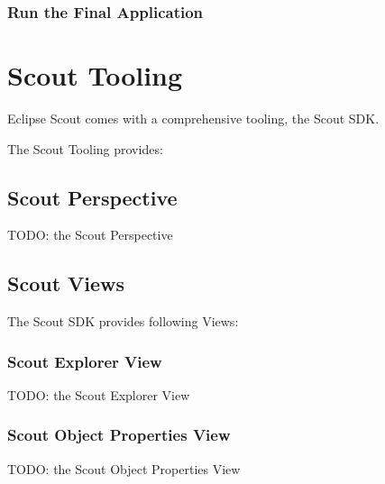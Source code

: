 \documentclass[a4paper,10pt,twoside]{book}
\begin{document}
\subsection*{Run the Final Application}


\chapter*{Scout Tooling}

Eclipse Scout comes with a comprehensive tooling, the Scout SDK.


The Scout Tooling provides:

\section*{Scout Perspective}
TODO: the Scout Perspective
\section*{Scout Views}

The Scout SDK provides following Views:

\subsection*{Scout Explorer View}
TODO: the Scout Explorer View
% 
\subsection*{Scout Object Properties View}
TODO: the Scout Object Properties View
% 

% 
% 
% 
% 

\end{document}

